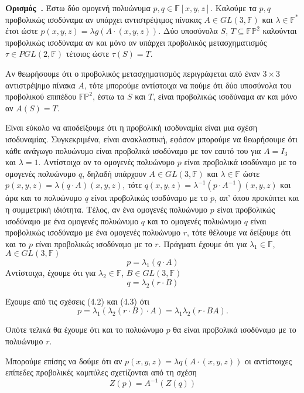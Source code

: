 \documentclass[12pt, a4paper]{book}
\newcounter{definition}[section]
\newenvironment{definition}[1][]{\refstepcounter{definition}\par\medskip
   \textbf{Ορισμός~\thedefinition. #1} \rmfamily}{\medskip}
\begin{document}
\begin{definition}
Έστω δύο ομογενή πολυώνυμα $p, q  \in \mathbb{F}[x,y,z]$. Καλούμε τα $p, q$ προβολικώς ισοδύναμα αν υπάρχει αντιστρέψιμος πίνακας $A \in GL(3,\mathbb{F})$ και $λ \in \mathbb{F}^*$ έτσι ώστε $p(x,y,z)=λg(A \cdot (x,y,z))$. Δύο υποσύνολα $S$, $T \subseteq \mathbb{F}\mathbb{P}^2$ καλούνται προβολικώς ισοδύναμα αν και μόνο αν υπάρχει προβολικός μετασχηματισμός $τ \in PGL(2,\mathbb{F})$ τέτοιος ώστε $τ(S)=T$.
\end{definition}

Αν θεωρήσουμε ότι ο προβολικός μετασχηματισμός περιγράφεται από έναν $3 \times 3$ αντιστρέψιμο πίνακα $A$, τότε μπορούμε αντίστοιχα να πούμε ότι δύο υποσύνολα του προβολικού επιπέδου $\mathbb{F}\mathbb{P}^2$, έστω τα $S$ και $T$, είναι προβολικώς ισοδύναμα αν και μόνο αν $A(S)=T$.

Είναι εύκολο να αποδείξουμε ότι η προβολική ισοδυναμία είναι μια σχέση ισοδυναμίας. Συγκεκριμένα, είναι ανακλαστική, εφόσον μπορούμε να θεωρήσουμε ότι κάθε ανάγωγο πολυώνυμο είναι προβολικά ισοδύναμο με τον εαυτό του για $A = I_3$ και $λ = 1$. Αντίστοιχα αν το ομογενές πολυώνυμο $p$ είναι προβολικά ισοδύναμο με το ομογενές πολυώνυμο $q$, δηλαδή υπάρχουν $A \in GL(3,\mathbb{F})$ και $λ \in \mathbb{F}$ ώστε $p(x,y,z)=λ(q \cdot A)(x,y,z)$, τότε $q(x,y,z)=λ^{-1}(p \cdot A^{-1})(x,y,z)$ και άρα και το πολυώνυμο $q$ είναι προβολικώς ισοδύναμο με το $p$, απ' όπου προκύπτει και η συμμετρική ιδιότητα. Τέλος, αν ένα ομογενές πολυώνυμο $p$ είναι προβολικώς ισοδύναμο με ένα ομογενές πολυώνυμο $q$ και το ομογενές πολυώνυμο $q$ είναι προβολικώς ισοδύναμο με ένα ομογενές πολυώνυμο $r$, τότε θέλουμε να δείξουμε ότι και το $p$ είναι προβολικώς ισοδύναμο με το $r$. Πράγματι έχουμε ότι για $λ_1 \in \mathbb{F}$, $A \in GL(3,\mathbb{F})$
\begin{equation}
p = λ_1(q \cdot A)
\end{equation}
Αντίστοιχα, έχουμε ότι για $λ_2 \in \mathbb{F}$, $B \in GL(3,\mathbb{F})$
\begin{equation}
q = λ_2(r \cdot Β)
\end{equation}

Έχουμε από τις σχέσεις (4.2) και (4.3) ότι
\begin{displaymath}
p = λ_1(λ_2(r \cdot B) \cdot A)= λ_1λ_2(r \cdot BA).
\end{displaymath}

Οπότε τελικά θα έχουμε ότι και το πολυώνυμο $p$ θα είναι προβολικά ισοδύναμο με το πολυώνυμο $r$.

Μπορούμε επίσης να δούμε ότι αν $p(x,y,z)=λq(A \cdot (x,y,z))$ οι αντίστοιχες επίπεδες προβολικές καμπύλες σχετίζονται από τη σχέση
\begin{equation}
Z(p)=A^{-1}(Z(q))
\end{equation}
\end{document}
